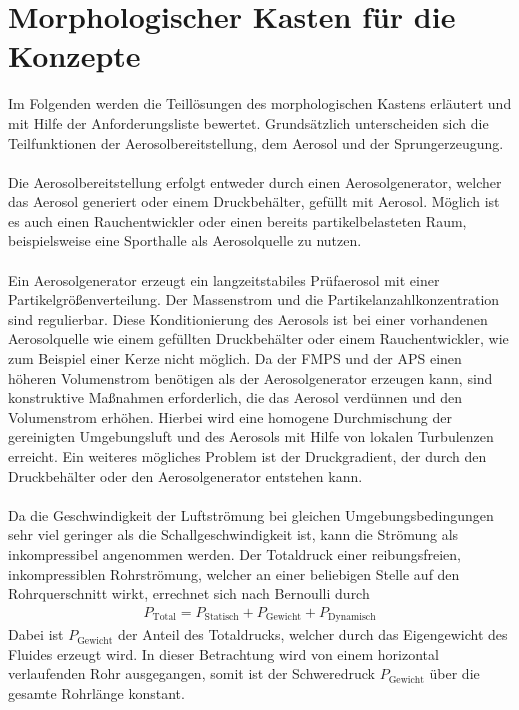 \section{Morphologischer Kasten f\"{u}r die Konzepte}
Im Folgenden werden die Teill\"{o}sungen des morphologischen Kastens erl\"{a}utert und mit Hilfe der Anforderungsliste bewertet. Grunds\"{a}tzlich unterscheiden sich die Teilfunktionen der Aerosolbereitstellung, dem Aerosol und der Sprungerzeugung.
\\\\
Die Aerosolbereitstellung erfolgt entweder durch einen Aerosolgenerator, welcher das Aerosol generiert oder einem Druckbeh\"{a}lter, gef\"{u}llt mit Aerosol. M\"{o}glich ist es auch einen Rauchentwickler oder einen bereits partikelbelasteten Raum, beispielsweise eine Sporthalle als Aerosolquelle zu nutzen.
\\\\
Ein Aerosolgenerator erzeugt ein langzeitstabiles Pr\"{u}faerosol mit einer Partikelgr\"{o}{\ss}enverteilung\cite{candle}. Der Massenstrom und die Partikelanzahlkonzentration sind regulierbar. Diese Konditionierung des Aerosols ist bei einer vorhandenen Aerosolquelle wie einem gef\"{u}llten Druckbeh\"{a}lter oder einem Rauchentwickler, wie zum Beispiel einer Kerze nicht m\"{o}glich. Da der FMPS und der APS einen h\"{o}heren Volumenstrom ben\"{o}tigen als der Aerosolgenerator erzeugen kann, sind konstruktive Ma{\ss}nahmen erforderlich, die das Aerosol verd\"{u}nnen und den Volumenstrom erh\"{o}hen. Hierbei wird eine homogene Durchmischung der gereinigten Umgebungsluft und des Aerosols mit Hilfe von lokalen Turbulenzen erreicht. Ein weiteres m\"{o}gliches Problem ist der Druckgradient, der durch den Druckbeh\"{a}lter oder den Aerosolgenerator entstehen kann.
\\\\
Da die Geschwindigkeit der Luftstr\"{o}mung bei gleichen Umgebungsbedingungen sehr viel geringer als die Schallgeschwindigkeit ist, kann die Str\"{o}mung als inkompressibel angenommen werden. Der Totaldruck einer reibungsfreien, inkompressiblen Rohrstr\"{o}mung, welcher an einer beliebigen Stelle auf den Rohrquerschnitt wirkt, errechnet sich nach Bernoulli durch
\begin{align*}
	P_\text{Total} = P_\text{Statisch} + P_\text{Gewicht} + P_\text{Dynamisch}
\end{align*}
Dabei ist \(P_\text{Gewicht}\) der Anteil des Totaldrucks, welcher durch das Eigengewicht des Fluides erzeugt wird. In dieser Betrachtung wird von einem horizontal verlaufenden Rohr ausgegangen, somit ist der Schweredruck \(P_\text{Gewicht}\) \"{u}ber die gesamte Rohrl\"{a}nge konstant.
